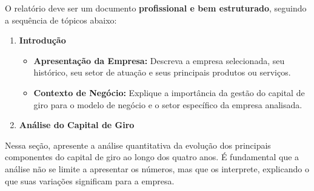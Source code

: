 \documentclass[
  a4paper,
]{book}
\providecommand{\tightlist}{%
  \setlength{\itemsep}{0pt}\setlength{\parskip}{0pt}}\usepackage{longtable,booktabs,array}
\begin{document}
O relatório deve ser um documento \textbf{profissional e bem
estruturado}, seguindo a sequência de tópicos abaixo:

\begin{enumerate}
\def\labelenumi{\arabic{enumi}.}
\item
  \textbf{Introdução}

  \begin{itemize}
  \tightlist
  \item
    \textbf{Apresentação da Empresa:} Descreva a empresa selecionada,
    seu histórico, seu setor de atuação e seus principais produtos ou
    serviços.\\
  \item
    \textbf{Contexto de Negócio:} Explique a importância da gestão do
    capital de giro para o modelo de negócio e o setor específico da
    empresa analisada.\\
  \end{itemize}
\item
  \textbf{Análise do Capital de Giro}
\end{enumerate}

Nessa seção, apresente a análise quantitativa da evolução dos principais
componentes do capital de giro ao longo dos quatro anos. É fundamental
que a análise não se limite a apresentar os números, mas que os
interprete, explicando o que suas variações significam para a empresa.
\end{document}
